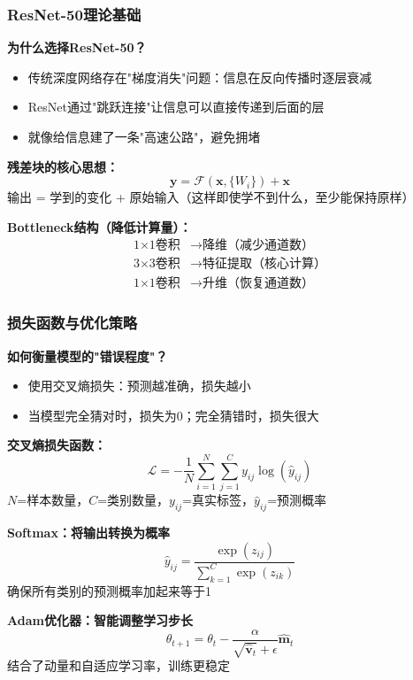 \documentclass[10pt]{beamer}
\begin{document}
\begin{frame}
\frametitle{ResNet-50理论基础}
\textbf{为什么选择ResNet-50？}
\begin{itemize}
    \item 传统深度网络存在"梯度消失"问题：信息在反向传播时逐层衰减
    \item ResNet通过"跳跃连接"让信息可以直接传递到后面的层
    \item 就像给信息建了一条"高速公路"，避免拥堵
\end{itemize}

\vspace{0.2cm}
\textbf{残差块的核心思想：}
\[
\mathbf{y} = \mathcal{F}(\mathbf{x}, \{W_i\}) + \mathbf{x}
\]
\small{输出 = 学到的变化 + 原始输入（这样即使学不到什么，至少能保持原样）}

\vspace{0.2cm}
\textbf{Bottleneck结构（降低计算量）：}
\[
\begin{aligned}
\text{1×1卷积} &\rightarrow \text{降维（减少通道数）} \\
\text{3×3卷积} &\rightarrow \text{特征提取（核心计算）} \\
\text{1×1卷积} &\rightarrow \text{升维（恢复通道数）}
\end{aligned}
\]
\end{frame}

\begin{frame}
\frametitle{损失函数与优化策略}
\textbf{如何衡量模型的"错误程度"？}
\begin{itemize}
    \item 使用交叉熵损失：预测越准确，损失越小
    \item 当模型完全猜对时，损失为0；完全猜错时，损失很大
\end{itemize}

\textbf{交叉熵损失函数：}
\[
\mathcal{L} = -\frac{1}{N}\sum_{i=1}^{N}\sum_{j=1}^{C} y_{ij} \log(\hat{y}_{ij})
\]
\small{\(N\)=样本数量，\(C\)=类别数量，\(y_{ij}\)=真实标签，\(\hat{y}_{ij}\)=预测概率}

\textbf{Softmax：将输出转换为概率}
\[
\hat{y}_{ij} = \frac{\exp(z_{ij})}{\sum_{k=1}^{C} \exp(z_{ik})}
\]
\small{确保所有类别的预测概率加起来等于1}

\textbf{Adam优化器：智能调整学习步长}
\[
\theta_{t+1} = \theta_t - \frac{\alpha}{\sqrt{\hat{\mathbf{v}}_t} + \epsilon} \hat{\mathbf{m}}_t
\]
\small{结合了动量和自适应学习率，训练更稳定}
\end{frame}
\end{document}
